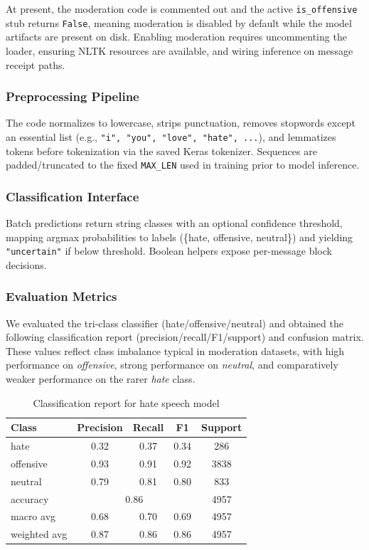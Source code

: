 \documentclass[conference]{IEEEtran}
\begin{document}
At present, the moderation code is commented out and the active \texttt{is\_offensive} stub returns \texttt{False}, meaning moderation is disabled by default while the model artifacts are present on disk. Enabling moderation requires uncommenting the loader, ensuring NLTK resources are available, and wiring inference on message receipt paths.

\subsubsection{Preprocessing Pipeline}
The code normalizes to lowercase, strips punctuation, removes stopwords except an essential list (e.g., \texttt{"i", "you", "love", "hate", ...}), and lemmatizes tokens before tokenization via the saved Keras tokenizer. Sequences are padded/truncated to the fixed \texttt{MAX\_LEN} used in training prior to model inference.

\subsubsection{Classification Interface}
Batch predictions return string classes with an optional confidence threshold, mapping argmax probabilities to labels (\{hate, offensive, neutral\}) and yielding \texttt{"uncertain"} if below threshold. Boolean helpers expose per-message block decisions.

\subsubsection{Evaluation Metrics}
We evaluated the tri-class classifier (hate/offensive/neutral) and obtained the following classification report (precision/recall/F1/support) and confusion matrix. These values reflect class imbalance typical in moderation datasets, with high performance on \textit{offensive}, strong performance on \textit{neutral}, and comparatively weaker performance on the rarer \textit{hate} class.

\begin{table}[t]
\centering
\caption{Classification report for hate speech model}
\begin{tabular}{lcccc}
\toprule
Class & Precision & Recall & F1 & Support \\
\midrule
hate & 0.32 & 0.37 & 0.34 & 286 \\
offensive & 0.93 & 0.91 & 0.92 & 3838 \\
neutral & 0.79 & 0.81 & 0.80 & 833 \\
\midrule
accuracy & \multicolumn{3}{c}{0.86} & 4957 \\
macro avg & 0.68 & 0.70 & 0.69 & 4957 \\
weighted avg & 0.87 & 0.86 & 0.86 & 4957 \\
\bottomrule
\end{tabular}
\label{tab:hate-report}
\end{table}
\end{document}
